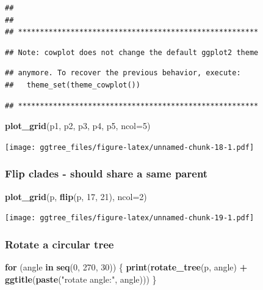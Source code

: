 \documentclass[]{article}
\newenvironment{Shaded}{\begin{snugshade}}{\end{snugshade}}
\newcommand{\KeywordTok}[1]{\textcolor[rgb]{0.13,0.29,0.53}{\textbf{#1}}}
\newcommand{\DataTypeTok}[1]{\textcolor[rgb]{0.13,0.29,0.53}{#1}}
\newcommand{\DecValTok}[1]{\textcolor[rgb]{0.00,0.00,0.81}{#1}}
\newcommand{\StringTok}[1]{\textcolor[rgb]{0.31,0.60,0.02}{#1}}
\newcommand{\ControlFlowTok}[1]{\textcolor[rgb]{0.13,0.29,0.53}{\textbf{#1}}}
\newcommand{\OperatorTok}[1]{\textcolor[rgb]{0.81,0.36,0.00}{\textbf{#1}}}
\newcommand{\NormalTok}[1]{#1}
\begin{document}
\begin{verbatim}
## 
## 
## *******************************************************
\end{verbatim}

\begin{verbatim}
## Note: cowplot does not change the default ggplot2 theme
\end{verbatim}

\begin{verbatim}
## anymore. To recover the previous behavior, execute:
##   theme_set(theme_cowplot())
\end{verbatim}

\begin{verbatim}
## *******************************************************
\end{verbatim}

\begin{Shaded}
\begin{Highlighting}[]
\KeywordTok{plot_grid}\NormalTok{(p1, p2, p3, p4, p5, }\DataTypeTok{ncol=}\DecValTok{5}\NormalTok{)}
\end{Highlighting}
\end{Shaded}

\texttt{[image: ggtree\_files/figure-latex/unnamed-chunk-18-1.pdf]}

\subsubsection{Flip clades - should share a same
parent}\label{flip-clades---should-share-a-same-parent}

\begin{Shaded}
\begin{Highlighting}[]
\KeywordTok{plot_grid}\NormalTok{(p, }\KeywordTok{flip}\NormalTok{(p, }\DecValTok{17}\NormalTok{, }\DecValTok{21}\NormalTok{), }\DataTypeTok{ncol=}\DecValTok{2}\NormalTok{)}
\end{Highlighting}
\end{Shaded}

\texttt{[image: ggtree\_files/figure-latex/unnamed-chunk-19-1.pdf]}

\subsubsection{Rotate a circular tree}\label{rotate-a-circular-tree}

\begin{Shaded}
\begin{Highlighting}[]
\ControlFlowTok{for}\NormalTok{ (angle }\ControlFlowTok{in} \KeywordTok{seq}\NormalTok{(}\DecValTok{0}\NormalTok{, }\DecValTok{270}\NormalTok{, }\DecValTok{30}\NormalTok{)) \{}
  \KeywordTok{print}\NormalTok{(}\KeywordTok{rotate_tree}\NormalTok{(p, angle) }\OperatorTok{+}\StringTok{ }\KeywordTok{ggtitle}\NormalTok{(}\KeywordTok{paste}\NormalTok{(}\StringTok{"rotate angle:"}\NormalTok{, angle)))}
\NormalTok{\}}
\end{Highlighting}
\end{Shaded}
\end{document}
